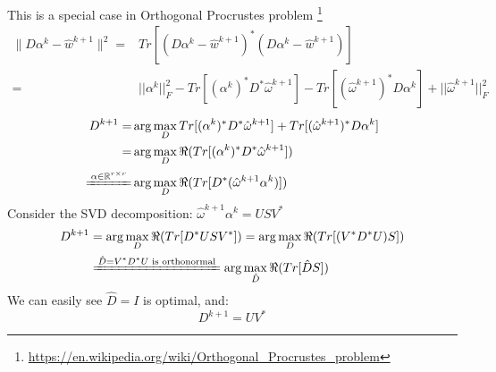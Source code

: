 \documentclass{article}
\numberwithin{equation}{section}
\begin{document}
This is a special case in Orthogonal Procrustes problem \footnote{\url{https://en.wikipedia.org/wiki/Orthogonal_Procrustes_problem}}
$$
\begin{aligned}
\| D\alpha^k - \hat {w}^{k+1}\|^{2} =& Tr[( D\alpha^k - \hat {w}^{k+1})^*( D\alpha^k - \hat {w}^{k+1})] \\
=& ||\alpha^k||_F^2 - Tr[(\alpha^k)^*D^*\hat{\omega}^{k+1}] - Tr[(\hat{\omega}^{k+1})^*D \alpha^k] + ||\hat{\omega}^{k+1}||_F^2
\end{aligned}
$$
$$
\begin{aligned}
D^{k+1} =& \arg \max_{D} Tr[(\alpha^k)^*D^*\hat{\omega}^{k+1}] + Tr[(\hat{\omega}^{k+1})^*D \alpha^k] \\
=& \arg \max_{D}  \Re{ (Tr[(\alpha^k)^*D^*\hat{\omega}^{k+1}] )}\\
\xlongequal{\alpha \in \mathbb{R}^{r\times r}}& \arg \max_{D}  \Re{ (Tr[D^* ( \hat{\omega}^{k+1}\alpha^k)]  )}
\end{aligned}
$$
Consider the SVD decomposition: $\hat{\omega}^{k+1}\alpha^k = USV^*$
$$
\begin{aligned}
D^{k+1} &= \arg \max_{D} \Re{ (Tr[D^*USV^*]  )}
= \arg \max_{D} \Re{ (Tr[(V^*D^*U)S]  )}\\
&\xlongequal{\hat{D} = V^*D^*U \text{ is orthonormal}}  \arg \max_{\hat{D}} \Re{ (Tr[\hat{D}S]  )}
\end{aligned}
$$
We can easily see $\hat{D} = I$ is optimal, and:
\begin{equation}
D^{k+1} = UV^*
\label{Dup}
\end{equation}
\end{document}
